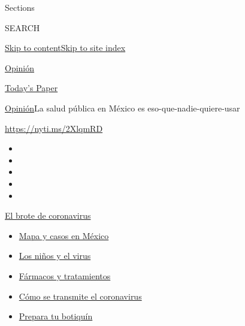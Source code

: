 Sections

SEARCH

\protect\hyperlink{site-content}{Skip to
content}\protect\hyperlink{site-index}{Skip to site index}

\href{https://www.nytimes.com/es/section/opinion}{Opinión}

\href{https://myaccount.nytimes.com/auth/login?response_type=cookie\&client_id=vi}{}

\href{https://www.nytimes.com/section/todayspaper}{Today's Paper}

\href{/es/section/opinion}{Opinión}\textbar{}La salud pública en México
es eso-que-nadie-quiere-usar

\url{https://nyti.ms/2XlqmRD}

\begin{itemize}
\item
\item
\item
\item
\item
\end{itemize}

\href{https://www.nytimes.com/es/spotlight/coronavirus?action=click\&pgtype=Article\&state=default\&region=TOP_BANNER\&context=storylines_menu}{El
brote de coronavirus}

\begin{itemize}
\tightlist
\item
  \href{https://www.nytimes.com/es/interactive/2020/espanol/america-latina/coronavirus-en-mexico.html?action=click\&pgtype=Article\&state=default\&region=TOP_BANNER\&context=storylines_menu}{Mapa
  y casos en México}
\item
  \href{https://www.nytimes.com/es/2020/07/31/espanol/ciencia-y-tecnologia/ninos-contagio-coronavirus.html?action=click\&pgtype=Article\&state=default\&region=TOP_BANNER\&context=storylines_menu}{Los
  niños y el virus}
\item
  \href{https://www.nytimes.com/es/interactive/2020/science/coronavirus-tratamientos-curas.html?action=click\&pgtype=Article\&state=default\&region=TOP_BANNER\&context=storylines_menu}{Fármacos
  y tratamientos}
\item
  \href{https://www.nytimes.com/es/2020/07/06/espanol/ciencia-y-tecnologia/coronavirus-transmision-aire.html?action=click\&pgtype=Article\&state=default\&region=TOP_BANNER\&context=storylines_menu}{Cómo
  se transmite el coronavirus}
\item
  \href{https://www.nytimes.com/es/2020/07/14/espanol/estilos-de-vida/botiquin-medicina-coronavirus.html?action=click\&pgtype=Article\&state=default\&region=TOP_BANNER\&context=storylines_menu}{Prepara
  tu botiquín}
\end{itemize}

